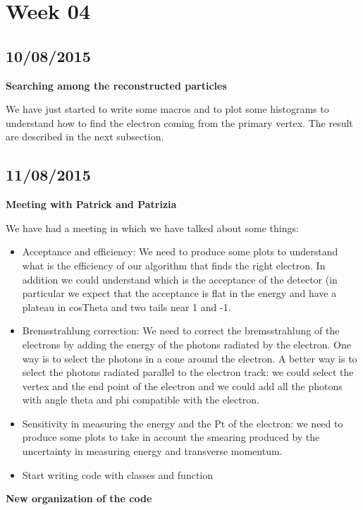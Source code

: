 \section{Week 04}

\subsection{10/08/2015}

\textbf{Searching among the reconstructed particles}

We have just started to write some macros and to plot some histograms to understand how to find the electron coming from the primary vertex. The result are described in the next subsection.

\subsection{11/08/2015}

\textbf{Meeting with Patrick and Patrizia}

We have had a meeting in which we have talked about some things:

\begin{itemize}
\item Acceptance and efficiency: We need to produce some plots to understand what is the efficiency of our algorithm that finds the right electron. In addition we could understand which is the acceptance of the detector (in particular we expect that the acceptance is flat in the energy and have a plateau in cosTheta and two tails near 1 and -1.
\item Bremsstrahlung correction: We need to correct the bremsstrahlung of the electrons by adding the energy of the photons radiated by the electron. One way is to select the photons in a cone around the electron. A better way is to select the photons radiated parallel to the electron track: we could select the vertex and the end point of the electron and we could add all the photons with angle theta and phi compatible with the electron.
\item Sensitivity in measuring the energy and the Pt of the electron: we need to produce some plots to take in account the smearing produced by the uncertainty in measuring energy and transverse momentum.
\item Start writing code with classes and function
\end{itemize}

\textbf{New organization of the code}

